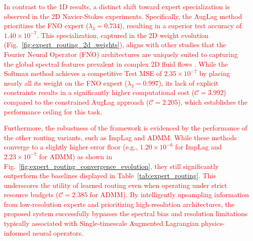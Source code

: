 \documentclass[preprint,12pt,authoryear]{elsarticle}
\begin{document}
\textcolor{red}{In contrast to the 1D results, a distinct shift toward expert specialization is observed in the 2D Navier-Stokes experiments. Specifically, the AugLag method prioritizes the FNO expert ($\lambda_3 = 0.734$), resulting in a superior test accuracy of $1.40 \times 10^{-7}$. This specialization, captured in the 2D weight evolution (Fig.~\ref{fig:expert_routing_2d_weights}), aligns with other studies that the Fourier Neural Operator (FNO) architectures are uniquely suited to capturing the global spectral features prevalent in complex 2D fluid flows \cite{li2021fourier}. While the Softmax method achieves a competitive Test MSE of $2.35 \times 10^{-7}$ by placing nearly all its weight on the FNO expert ($\lambda_3 = 0.997$), its lack of explicit constraints results in a significantly higher computational cost ($\mathcal{C} = 3.992$) compared to the constrained AugLag approach ($\mathcal{C} = 2.205$), which establishes the performance ceiling for this task.}

\textcolor{red}{Furthermore, the robustness of the framework is evidenced by the performance of the other routing variants, such as ImpLag and ADMM. While these methods converge to a slightly higher error floor (e.g., $1.20 \times 10^{-6}$ for ImpLag and $2.23 \times 10^{-7}$ for ADMM) as shown in Fig.~\ref{fig:expert_routing_convergence_evolution}, they still significantly outperform the baselines displayed in Table~\ref{tab:expert_routing}. This underscores the utility of learned routing even when operating under strict resource budgets ($\mathcal{C} = 2.385$ for ADMM). By intelligently upsampling information from low-resolution experts and prioritizing high-resolution architectures, the proposed system successfully bypasses the spectral bias and resolution limitations typically associated with Single-timescale Augmented Lagrangian physics-informed neural operators.}
\end{document}
